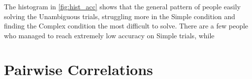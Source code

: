 The histogram in \autoref{fig:hist_acc} shows that the general pattern of people easily solving the Unambiguous trials, struggling more in the Simple condition and finding the Complex condition the most difficult to solve. There are a few people who managed to reach extremely low accuracy on Simple trials, while 

\begin{figure}
\centering
\begin{floatrow}
\end{floatrow}
\end{figure}












\section{Pairwise Correlations}
\label{sec:pairwise_corr}

